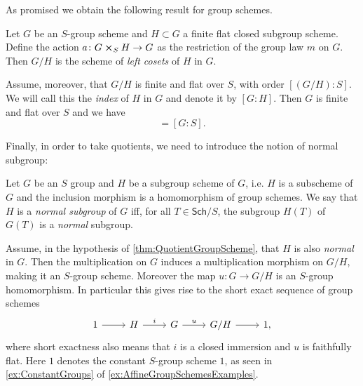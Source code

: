 \noindent
As promised we obtain the following result for group schemes.
\begin{prop}\label{thm:QuotientGroupScheme}
	Let $G$ be an $S$-group scheme and $H \subset G$ a finite flat closed
	subgroup scheme.
	Define the action $a\colon G \cross_{ S } H \to G$ as the restriction of the
	group law $m$ on $G$.
	Then $G/H$ is the scheme of {\em left cosets} of $H$ in $G$.

	Assume, moreover, that $G/H$ is finite and flat over $S$,
	with order $[(G/H):S]$. We will call this the {\em index} of $H$ in $G$
	and denote it by $[G:H]$.
	Then $G$ is finite and flat over $S$ and we have
	\begin{equation*}
		[G:H][H:S] = [G:S]
	.\end{equation*} 
\end{prop}


\noindent
Finally, in order to take quotients, we need to introduce the notion
of normal subgroup:
\begin{defn}
	Let $G$ be an $S$ group and $H$ be a subgroup scheme of $G$,
	i.e. $H$ is a subscheme of $G$ and the inclusion morphism
	is a homomorphism of group schemes.
	We say that $H$ is a {\em normal subgroup} of $G$ iff, for all $T \in \mathsf{Sch}/S$,
	the subgroup $H(T)$ of $G(T)$ is a {\em normal} subgroup.
\end{defn}


\begin{rem}
	Assume, in the hypothesis of \cref{thm:QuotientGroupScheme}, that $H$ is
	also {\em normal} in $G$.
	Then the multiplication on $G$ induces a multiplication 
	morphism on $G/H$, making it an $S$-group scheme.
	Moreover the map $u\colon G \to G/H$ is
	an $S$-group homomorphism.
	In particular this gives rise to the short exact sequence of group schemes
	\begin{equation*}
	\begin{tikzcd}
		1 \arrow[r, "", rightarrow] &
		H \arrow[r, "i", rightarrow] &
		G \arrow[r, "u", rightarrow] &
		G/H \arrow[r, "", rightarrow] &
		1
	,\end{tikzcd}
	\end{equation*}
	where short exactness also means that $i$ is a closed immersion
	and $u$ is faithfully flat.
	Here $1$ denotes the constant $S$-group scheme $1$, as
	seen in \cref{ex:ConstantGroups} of
	\cref{ex:AffineGroupSchemesExamples}.
\end{rem}



